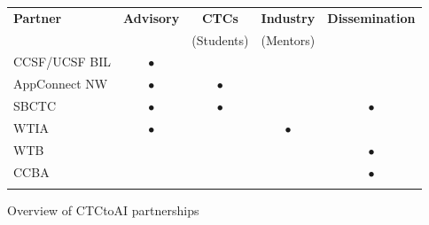 \begin{figure}[H]
    \fontsize{11pt}{11pt}\selectfont
    \begin{tabularx}{\textwidth}{ X c c c c }
        \toprule
        \textbf{Partner}
            & \textbf{Advisory}
            & \textbf{CTCs}
            & \textbf{Industry}
            & \textbf{Dissemination} \\
        
        & & (Students) & (Mentors) & \\
        \midrule \endhead
        \bottomrule\endfoot
    
        CCSF/UCSF BIL & $\bullet$ & & &  \\ \addlinespace \hline \addlinespace
        AppConnect NW & $\bullet$ & $\bullet$ & & \\ \addlinespace \hline \addlinespace
        SBCTC & $\bullet$ & $\bullet$ & & $\bullet$ \\ \addlinespace \hline \addlinespace
        WTIA & $\bullet$ & & $\bullet$  & \\ \addlinespace \hline\addlinespace
        WTB & & & & $\bullet$ \\ \addlinespace \hline \addlinespace
        CCBA & & & & $\bullet$ \\ \addlinespace \hline
        
    \end{tabularx}
    
    \caption{Overview of CTCtoAI partnerships}
    \label{fig:partnerRoles}
\end{figure}